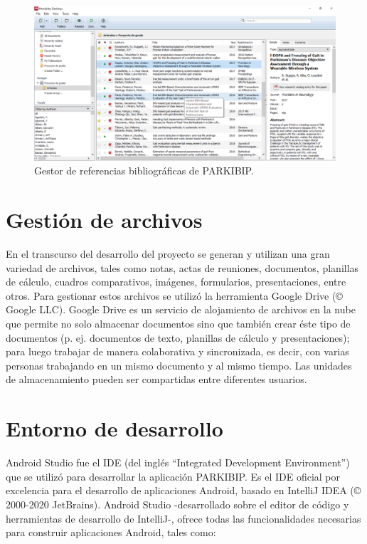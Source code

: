 \begin{figure}[H]
\includegraphics[width=\textwidth]{TESIS/imagenes/chap04/Mendeley.png}
\caption{ Gestor de referencias bibliográficas de PARKIBIP.}
\label{fig:admin_references}
\end{figure}

\section{Gestión de archivos}

En el transcurso del desarrollo del proyecto se generan y utilizan una gran variedad de archivos, tales como notas, actas de reuniones, documentos, planillas de cálculo, cuadros comparativos, imágenes, formularios, presentaciones, entre otros. Para gestionar estos archivos se utilizó la herramienta Google Drive (© Google LLC). Google Drive es un servicio de alojamiento de archivos en la nube que permite no solo almacenar documentos sino que también crear éste tipo de documentos (p. ej. documentos de texto, planillas de cálculo y presentaciones); para luego trabajar de manera colaborativa y sincronizada, es decir, con varias personas trabajando en un mismo documento y al mismo tiempo. Las unidades de almacenamiento pueden ser compartidas entre diferentes usuarios.

\section{Entorno de desarrollo}


Android Studio fue el \gls{IDE} (del inglés ``Integrated Development Environment'') que se utilizó para desarrollar la aplicación PARKIBIP. Es el IDE oficial por excelencia para el desarrollo de aplicaciones Android, basado en IntelliJ IDEA (© 2000-2020 JetBrains). Android Studio -desarrollado sobre el editor de código y herramientas de desarrollo de IntelliJ-,  ofrece todas las funcionalidades necesarias para construir aplicaciones Android, tales como:


